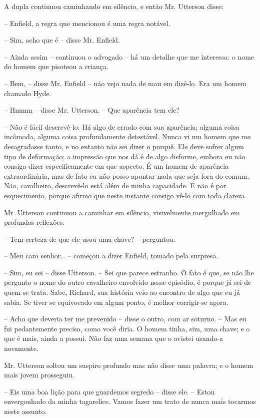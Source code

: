 A dupla continuou caminhando em silêncio, e então Mr. Utterson disse:

-- Enfield, a regra que mencionou é uma regra notável.

-- Sim, acho que é -- disse Mr. Enfield.

-- Ainda assim -- continuou o advogado -- há um detalhe que me interessa:
o nome do homem que pisoteou a criança.

-- Bem, -- disse Mr. Enfield -- não vejo nada de mau em dizê-lo.  Era um
homem chamado Hyde.

-- Hmmm -- disse Mr. Utterson. -- Que aparência tem ele?

-- Não é fácil descrevê-lo.  Há algo de errado com sua aparência;
alguma coisa incômoda, alguma coisa profundamente detestável.  Nunca vi
um homem que me desagradasse tanto, e no entanto não sei dizer o
porquê.  Ele deve sofrer algum tipo de deformação; a impressão que nos
dá é de algo disforme, embora eu não consiga dizer especificamente em
que aspecto.  É um homem de aparência extraordinária, mas de fato eu
não posso apontar nada que seja fora do comum.  Não, cavalheiro,
descrevê-lo está além de minha capacidade.  E não é por esquecimento,
porque afirmo que neste instante consigo vê-lo com toda clareza.

Mr. Utterson continuou a caminhar em silêncio, visivelmente mergulhado
em profundas reflexões.

-- Tem certeza de que ele usou uma chave? -- perguntou.

-- Meu caro senhor\ldots{} -- começou a dizer Enfield, tomado pela surpresa.

-- Sim, eu sei -- disse Utterson. -- Sei que parece estranho.  O fato é
que, se não lhe pergunto o nome do outro cavalheiro envolvido nesse
episódio, é porque já sei de quem se trata.  Sabe, Richard, sua
história veio ao encontro de algo que eu já sabia.  Se tiver se
equivocado em algum ponto, é melhor corrigir-se agora.

-- Acho que deveria ter me prevenido -- disse o outro, com ar soturno. --
Mas eu fui pedantemente preciso, como você diria.  O homem tinha, sim,
uma chave; e o que é mais, ainda a possui.  Não faz uma semana que o
avistei usando-a novamente. 

Mr. Utterson soltou um suspiro profundo mas não disse uma palavra; e o
homem mais jovem prosseguiu.

-- Eis uma boa lição para que guardemos segredo -- disse ele. -- Estou		%
envergonhado da minha tagarelice.  Vamos fazer um trato de nunca mais
tocarmos neste assunto.

